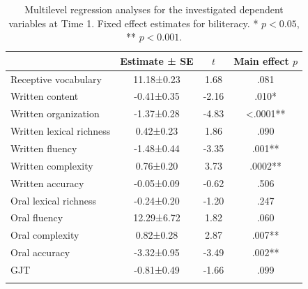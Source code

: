 \documentclass[output=paper,modfonts,nonflat,newtxmath]{langsci/langscibook}
\begin{document}
\begin{table}

	\caption{\label{tab:pfenninger:6}Multilevel regression analyses for the investigated dependent variables at Time 1. Fixed effect estimates for biliteracy. * $p <0.05$, ** $p<0.001$.}
    \begin{tabular}{lS[table-format=-1.3,parse-numbers=false]SS[table-format=<1.4]}
		\lsptoprule
		& {Estimate ± SE} & {$t$}  & {Main effect $p$}\\\midrule
		Receptive vocabulary & 11.18±0.23 & 1.68 &.081\\
		Written content & -0.41±0.35 & -2.16 & .010*\\
		Written organization & -1.37±0.28 & -4.83 & <.0001**\\
		Written lexical richness & 0.42±0.23 & 1.86 & .090\\
		Written fluency & -1.48±0.44 & -3.35 & .001**\\
		Written complexity & 0.76±0.20 & 3.73 & .0002**\\
		Written accuracy & -0.05±0.09 & -0.62 & .506\\
		Oral lexical richness & -0.24±0.20 & -1.20 & .247\\
		Oral fluency & 12.29±6.72 & 1.82 & .060\\
		Oral complexity & 0.82±0.28 & 2.87 & .007**\\
		Oral accuracy & -3.32±0.95 & -3.49 & .002**\\
		GJT & -0.81±0.49 &-1.66 & .099\\
		\lspbottomrule
	\end{tabular}
\end{table}
\end{document}
